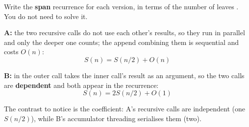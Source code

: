 \begin{parts}
    Write the \textbf{span} recurrence for each version, in terms of the number of
    leaves . You do not need to solve it.

    \begin{solutionorbox}[20em]
      \textbf{A:} the two recursive calls do not use each other's results, so
      they run in parallel and only the deeper one counts; the append combining
      them is sequential and costs $O(n)$:
      $$S(n) = S(n/2) + O(n)$$

      \textbf{B:} in  the outer call takes
      the inner call's result as an argument, so the two calls are
      \textbf{dependent} and both appear in the recurrence:
      $$S(n) = 2S(n/2) + O(1)$$

      The contrast to notice is the coefficient: A's recursive calls are
      independent (one $S(n/2)$), while B's accumulator threading serialises
      them (two).
    \end{solutionorbox}
\end{parts}

\newpage
